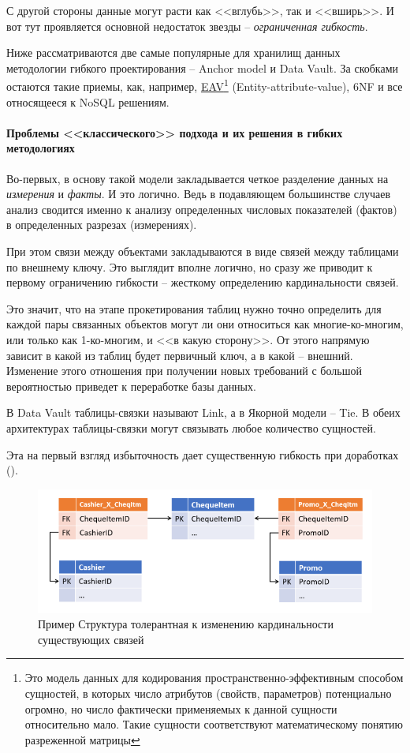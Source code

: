 \documentclass[%
	11pt,
	a4paper,
	utf8,
		]{article}
\begin{document}
С другой стороны данные могут расти как <<вглубь>>, так и  <<вширь>>. И вот тут проявляется основной недостаток звезды -- \emph{ограниченная гибкость}.

Ниже рассматриваются две самые популярные для хранилищ данных методологии гибкого проектирования -- Anchor model и Data Vault. За скобками остаются такие приемы, как, например, \href{https://en.wikipedia.org/wiki/Entity–attribute–value_model}{EAV}\footnote{Это модель данных для кодирования пространственно-эффективным способом сущностей, в которых число атрибутов (свойств, параметров) потенциально огромно, но число фактически применяемых к данной сущности относительно мало. Такие сущности соответствуют математическому понятию разреженной матрицы} (Entity-attribute-value), 6NF и все относящееся к NoSQL решениям.

\paragraph{Проблемы <<классического>> подхода и их решения в гибких методологиях} Во-первых, в основу такой модели закладывается четкое разделение данных на \emph{измерения} и \emph{факты}. И это логично. Ведь в подавляющем большинстве случаев анализ сводится именно к анализу определенных числовых показателей (фактов) в определенных разрезах (измерениях).

При этом связи между объектами закладываются в виде связей между таблицами по внешнему ключу. Это выглядит вполне логично, но сразу же приводит к первому ограничению гибкости -- жесткому определению кардинальности связей.

Это значит, что на этапе прокетирования таблиц нужно точно определить для каждой пары связанных объектов могут ли они относиться как многие-ко-многим, или только как 1-ко-многим, и <<в какую сторону>>. От этого напрямую зависит в какой из таблиц будет первичный ключ, а в какой -- внешний. Изменение этого отношения при получении новых требований с большой вероятностью приведет к переработке базы данных.

В Data Vault таблицы-связки называют Link, а в Якорной модели -- Tie. В обеих архитектурах таблицы-связки могут связывать любое количество сущностей.

Эта на первый взгляд избыточность дает существенную гибкость при доработках ().

\begin{figure}[h]
	\centering
	\includegraphics[scale=0.85]{figures/links.png}
	\caption{ Пример Структура толерантная к изменению кардинальности существующих связей }\label{fig:links}
\end{figure}
\end{document}
